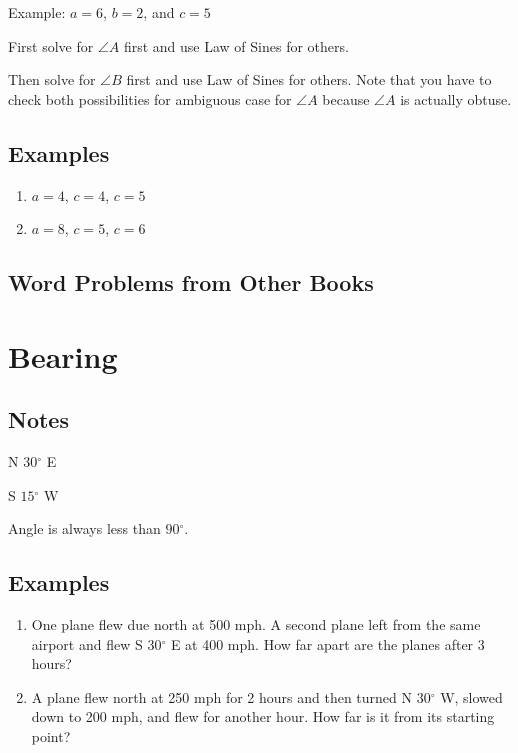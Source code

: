 \documentclass{exam}
\newcommand{\dg}{\ensuremath{^\circ}}
\begin{document}
  Example: $a = 6$, $b = 2$, and $c = 5$

  \begin{itemize*}
    \item First solve for $\angle A$ first and use Law of Sines for others.
    \item Then solve for $\angle B$ first and use Law of Sines for others.  Note that you have to check both
      possibilities for ambiguous case for $\angle A$ because $\angle A$ is actually obtuse.
  \end{itemize*}

  \subsection{Examples}

  \begin{enumerate}

    \item $a = 4$, $c = 4$, $c = 5$

    \item $a = 8$, $c = 5$, $c = 6$

  \end{enumerate}

  \subsection{Word Problems from Other Books}

  \section{Bearing}
  \subsection{Notes}
  \begin{itemize*}
    \item N $30 \dg$ E
    \item S $15 \dg$ W
  \end{itemize*}

  Angle is always less than $90 \dg$.

  \subsection{Examples}
  \begin{enumerate}
    \item One plane flew due north at 500 mph.  A second plane left from the same airport and flew S $30 \dg$ E at 400
      mph.  How far apart are the planes after 3 hours?

    \item A plane flew north at 250 mph for 2 hours and then turned N $30 \dg$ W, slowed down to 200 mph, and flew for
      another hour.  How far is it from its starting point?

  \end{enumerate}
\end{document}
